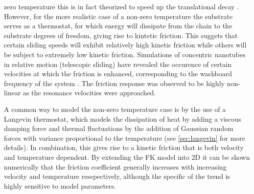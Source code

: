 zero temperature this is in fact theorized to speed up the translational decay \cite{FK2D}.
However, for the more realistic case of a non-zero temperature the substrate
serves as a thermostat, for which energy will dissipate from the chain to the
substrate degrees of freedom, giving rise to kintetic friction. This suggets
that certain sliding speeds will exhibit relatively high kinetic friction while
others will be subject to extremely low kinetic friction. Simulations of
concentric nanotubes in relative motion (telescopic sliding) have revealed the
occurence of certain velocities at which the friction is enhanced, corresponding
to the washboard frequency of the system \cite{Manini_2016}. The friction
response was observed to be highly non-linear as the resonance velocities were
approached. 


A common way to model the non-zero temperature case is by the use of a Langevin
thermostat, which models the dissipation of heat by adding a viscous damping
force and thermal fluctuations by the addition of Gaussian random forces with
variance proportional to the temperature (see \cref{sec:langevin} for more details). In combination, this gives rise to a kinetic
friction that is both velocity and temperature dependent. By extending the \acrshort{FK} model into 2D \cite{FK2D} it can be shown numerically that
the friction coefficient generally increases with increasing velocity and
temperature resepectively, although the specific of the trend is highly
sensitive to model parameters. 








